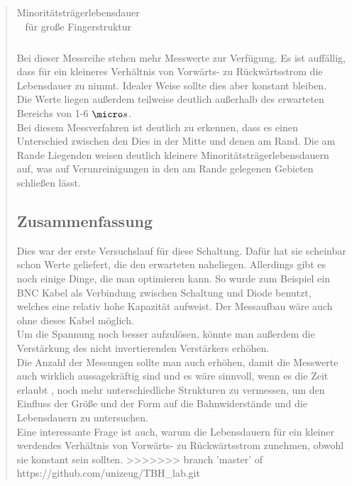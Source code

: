 \begin{quote}
\begin{table}[H]
\begin{addmargin}[-0.5cm]{3cm}
\begin{tabular}{|p{5cm}|p{5cm}|p{5cm}|}
                    \end{tabular}
              \end{addmargin}
              \caption{Minoritätsträgerlebensdauer für große Fingerstruktur}
              \label{tab:grossetab2}
            \end{table}

     \vspace{2em}

     Bei dieser Messreihe stehen mehr Messwerte zur Verfügung. Es ist auffällig,
     dass für ein kleineres Verhältnis von Vorwärts- zu Rückwärtsstrom die
     Lebensdauer zu nimmt. Idealer Weise sollte dies aber konstant bleiben.\\
     Die Werte liegen außerdem teilweise deutlich außerhalb des erwarteten
     Bereichs von 1-6 $\micro s$. \\
     Bei diesem Messverfahren ist deutlich zu erkennen, dass es einen
     Unterschied zwischen den Dies in der Mitte und denen am Rand. Die am Rande
     Liegenden weisen deutlich kleinere Minoritätsträgerlebensdauern auf, was
     auf Verunreinigungen in den am Rande gelegenen Gebieten schließen lässt.

	 \subsection{Zusammenfassung}

	 Dies war der erste Versuchslauf für diese Schaltung. Dafür hat sie
	 scheinbar schon Werte geliefert, die den erwarteten naheliegen. Allerdings
	 gibt es noch einige Dinge, die man optimieren kann. So wurde zum Beispiel
	 ein BNC Kabel als Verbindung zwischen Schaltung und Diode benutzt, welches
	 eine relativ hohe Kapazität aufweist. Der Messaufbau wäre auch ohne dieses
	 Kabel möglich.\\
	 Um die Spannung noch besser aufzulösen, könnte man außerdem die
	 Verstärkung des nicht invertierenden Verstärkers erhöhen.\\
	 Die Anzahl der Messungen sollte man auch erhöhen, damit die Messwerte auch
	 wirklich aussagekräftig sind und es wäre sinnvoll, wenn es die Zeit erlaubt
	 , noch mehr unterschiedliche Strukturen zu vermessen, um den Einfluss der
	 Größe und der Form auf die Bahnwiderstände und die Lebensdauern zu
	 untersuchen.\\
	 Eine interessante Frage ist auch, warum die Lebensdauern für ein kleiner
	 werdendes Verhältnis von Vorwärts- zu Rückwärtsstrom zunehmen, obwohl sie
	 konstant sein sollten.
>>>>>>> branch 'master' of https://github.com/unizeug/TBH_lab.git



\end{quote} %



